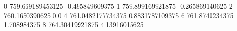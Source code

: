 0 759.669189453125 -0.495849609375
1 759.899169921875 -0.265869140625
2 760.1650390625 0.0
4 761.0482177734375 0.8831787109375
6 761.8740234375 1.708984375
8 764.30419921875 4.13916015625

